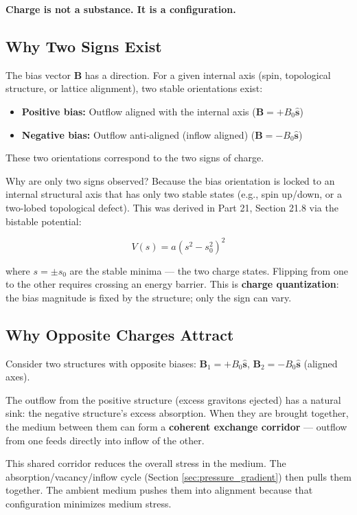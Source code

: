 \documentclass[12pt, a4paper]{article}
\begin{document}
\textbf{Charge is not a substance. It is a configuration.}

\subsection{Why Two Signs Exist}
\label{subsec:two_signs}

The bias vector \( \mathbf{B} \) has a direction. For a given internal axis (spin, topological structure, or lattice alignment), two stable orientations exist:

\begin{itemize}
    \item \textbf{Positive bias:} Outflow aligned with the internal axis (\( \mathbf{B} = +B_0 \hat{\mathbf{s}} \))
    \item \textbf{Negative bias:} Outflow anti-aligned (inflow aligned) (\( \mathbf{B} = -B_0 \hat{\mathbf{s}} \))
\end{itemize}

These two orientations correspond to the two signs of charge.

Why are only two signs observed? Because the bias orientation is locked to an internal structural axis that has only two stable states (e.g., spin up/down, or a two-lobed topological defect). This was derived in Part 21, Section 21.8 via the bistable potential:

\[
V(s) = a(s^2 - s_0^2)^2
\]

where \( s = \pm s_0 \) are the stable minima — the two charge states. Flipping from one to the other requires crossing an energy barrier. This is \textbf{charge quantization}: the bias magnitude is fixed by the structure; only the sign can vary.

\subsection{Why Opposite Charges Attract}
\label{subsec:opposite_attract}

Consider two structures with opposite biases: \( \mathbf{B}_1 = +B_0 \hat{\mathbf{s}} \), \( \mathbf{B}_2 = -B_0 \hat{\mathbf{s}} \) (aligned axes).

The outflow from the positive structure (excess gravitons ejected) has a natural sink: the negative structure's excess absorption. When they are brought together, the medium between them can form a \textbf{coherent exchange corridor} — outflow from one feeds directly into inflow of the other.

This shared corridor reduces the overall stress in the medium. The absorption/vacancy/inflow cycle (Section \ref{sec:pressure_gradient}) then pulls them together. The ambient medium pushes them into alignment because that configuration minimizes medium stress.
\end{document}
